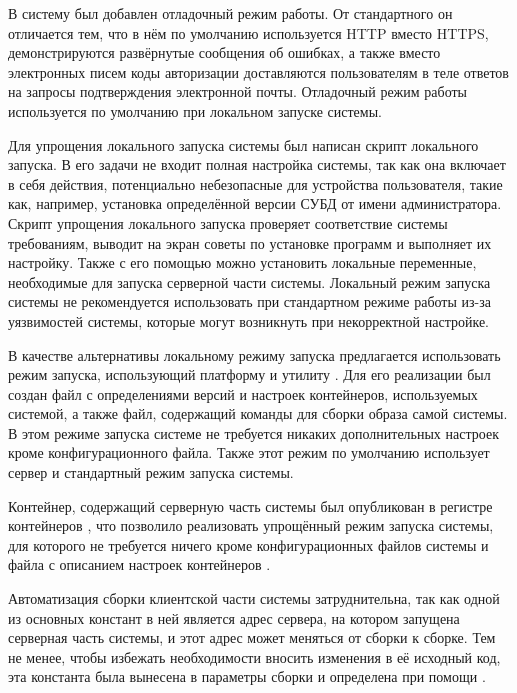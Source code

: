 \tab
В систему был добавлен отладочный режим работы.
От стандартного он отличается тем, что в нём по умолчанию используется HTTP вместо HTTPS, демонстрируются развёрнутые сообщения об ошибках, а также вместо электронных писем коды авторизации доставляются пользователям в теле ответов на запросы подтверждения электронной почты.
Отладочный режим работы используется по умолчанию при локальном запуске системы.

\tab
Для упрощения локального запуска системы был написан скрипт локального запуска.
В его задачи не входит полная настройка системы, так как она включает в себя действия, потенциально небезопасные для устройства пользователя, такие как, например, установка определённой версии СУБД от имени администратора.
Скрипт упрощения локального запуска проверяет соответствие системы требованиям, выводит на экран советы по установке программ и выполняет их настройку.
Также с его помощью можно установить локальные переменные, необходимые для запуска серверной части системы.
Локальный режим запуска системы не рекомендуется использовать при стандартном режиме работы из-за уязвимостей системы, которые могут возникнуть при некорректной настройке.

\tab
В качестве альтернативы локальному режиму запуска предлагается использовать режим запуска, использующий платформу  и утилиту .
Для его реализации был создан файл с определениями версий и настроек контейнеров, используемых системой, а также файл, содержащий команды для сборки образа самой системы.
В этом режиме запуска системе не требуется никаких дополнительных настроек кроме конфигурационного файла.
Также этот режим по умолчанию использует сервер  и стандартный режим запуска системы.

\tab
Контейнер, содержащий серверную часть системы был опубликован в регистре контейнеров \cite{http://ghcr.io/}, что позволило реализовать упрощённый режим запуска системы, для которого не требуется ничего кроме конфигурационных файлов системы и файла с описанием настроек контейнеров .

\tab
Автоматизация сборки клиентской части системы затруднительна, так как одной из основных констант в ней является адрес сервера, на котором запущена серверная часть системы, и этот адрес может меняться от сборки к сборке.
Тем не менее, чтобы избежать необходимости вносить изменения в её исходный код, эта константа была вынесена в параметры сборки и определена при помощи .

